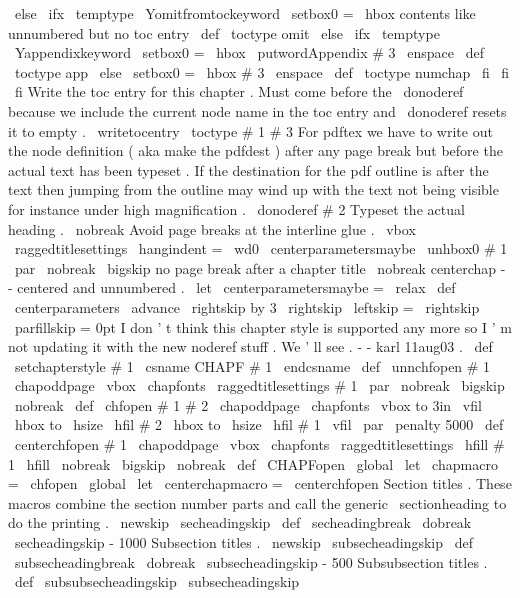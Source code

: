 {{{{{{{}
%
\
else
\
ifx
\
temptype
\
Yomitfromtockeyword
\
setbox0
=
\
hbox
{
}
%
contents
like
unnumbered
but
no
toc
entry
\
def
\
toctype
{
omit
}
%
\
else
\
ifx
\
temptype
\
Yappendixkeyword
\
setbox0
=
\
hbox
{
\
putwordAppendix
{
}
#
3
\
enspace
}
%
\
def
\
toctype
{
app
}
%
\
else
\
setbox0
=
\
hbox
{
#
3
\
enspace
}
%
\
def
\
toctype
{
numchap
}
%
\
fi
\
fi
\
fi
%
%
Write
the
toc
entry
for
this
chapter
.
Must
come
before
the
%
\
donoderef
because
we
include
the
current
node
name
in
the
toc
%
entry
and
\
donoderef
resets
it
to
empty
.
\
writetocentry
{
\
toctype
}
{
#
1
}
{
#
3
}
%
%
%
For
pdftex
we
have
to
write
out
the
node
definition
(
aka
make
%
the
pdfdest
)
after
any
page
break
but
before
the
actual
text
has
%
been
typeset
.
If
the
destination
for
the
pdf
outline
is
after
the
%
text
then
jumping
from
the
outline
may
wind
up
with
the
text
not
%
being
visible
for
instance
under
high
magnification
.
\
donoderef
{
#
2
}
%
%
%
Typeset
the
actual
heading
.
\
nobreak
%
Avoid
page
breaks
at
the
interline
glue
.
\
vbox
{
\
raggedtitlesettings
\
hangindent
=
\
wd0
\
centerparametersmaybe
\
unhbox0
#
1
\
par
}
%
}
%
\
nobreak
\
bigskip
%
no
page
break
after
a
chapter
title
\
nobreak
}
%
centerchap
-
-
centered
and
unnumbered
.
\
let
\
centerparametersmaybe
=
\
relax
\
def
\
centerparameters
{
%
\
advance
\
rightskip
by
3
\
rightskip
\
leftskip
=
\
rightskip
\
parfillskip
=
0pt
}
%
I
don
'
t
think
this
chapter
style
is
supported
any
more
so
I
'
m
not
%
updating
it
with
the
new
noderef
stuff
.
We
'
ll
see
.
-
-
karl
11aug03
.
%
\
def
\
setchapterstyle
#
1
{
\
csname
CHAPF
#
1
\
endcsname
}
%
\
def
\
unnchfopen
#
1
{
%
\
chapoddpage
\
vbox
{
\
chapfonts
\
raggedtitlesettings
#
1
\
par
}
%
\
nobreak
\
bigskip
\
nobreak
}
\
def
\
chfopen
#
1
#
2
{
\
chapoddpage
{
\
chapfonts
\
vbox
to
3in
{
\
vfil
\
hbox
to
\
hsize
{
\
hfil
#
2
}
\
hbox
to
\
hsize
{
\
hfil
#
1
}
\
vfil
}
}
%
\
par
\
penalty
5000
%
}
\
def
\
centerchfopen
#
1
{
%
\
chapoddpage
\
vbox
{
\
chapfonts
\
raggedtitlesettings
\
hfill
#
1
\
hfill
}
%
\
nobreak
\
bigskip
\
nobreak
}
\
def
\
CHAPFopen
{
%
\
global
\
let
\
chapmacro
=
\
chfopen
\
global
\
let
\
centerchapmacro
=
\
centerchfopen
}
%
Section
titles
.
These
macros
combine
the
section
number
parts
and
%
call
the
generic
\
sectionheading
to
do
the
printing
.
%
\
newskip
\
secheadingskip
\
def
\
secheadingbreak
{
\
dobreak
\
secheadingskip
{
-
1000
}
}
%
Subsection
titles
.
\
newskip
\
subsecheadingskip
\
def
\
subsecheadingbreak
{
\
dobreak
\
subsecheadingskip
{
-
500
}
}
%
Subsubsection
titles
.
\
def
\
subsubsecheadingskip
{
\
subsecheadingskip
}
}}}}
